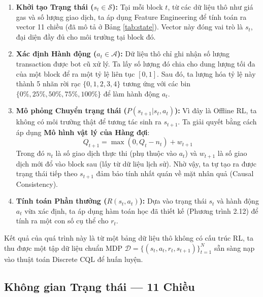 \begin{enumerate}
    \item \textbf{Khởi tạo Trạng thái ($s_t \in \mathcal{S}$):} 
    Tại mỗi block $t$, từ các dữ liệu thô như giá gas và số lượng giao dịch, ta áp dụng Feature Engineering để tính toán ra vector 11 chiều (đã mô tả ở Bảng \ref{tab:state}). Vector này đóng vai trò là $s_t$, đại diện đầy đủ cho môi trường tại block đó.
    
    \item \textbf{Xác định Hành động ($a_t \in \mathcal{A}$):} 
    Dữ liệu thô chỉ ghi nhận số lượng transaction được bot cũ xử lý. Ta lấy số lượng đó chia cho dung lượng tối đa của một block để ra một tỷ lệ liên tục $[0, 1]$. Sau đó, ta lượng hóa tỷ lệ này thành 5 nhãn rời rạc $\{0, 1, 2, 3, 4\}$ tương ứng với các bin $\{0\%, 25\%, 50\%, 75\%, 100\%\}$ để làm hành động $a_t$.
    
    \item \textbf{Mô phỏng Chuyển trạng thái ($P(s_{t+1}|s_t, a_t)$):} 
    Vì đây là Offline RL, ta không có môi trường thật để tương tác sinh ra $s_{t+1}$. Ta giải quyết bằng cách áp dụng \textbf{Mô hình vật lý của Hàng đợi}:
    $$Q_{t+1} = \max(0, Q_t - n_t) + w_{t+1}$$
    Trong đó $n_t$ là số giao dịch thực thi (phụ thuộc vào $a_t$) và $w_{t+1}$ là số giao dịch mới đổ vào block sau (lấy từ dữ liệu lịch sử). Nhờ vậy, ta tự tạo ra được trạng thái tiếp theo $s_{t+1}$ đảm bảo tính nhất quán về mặt nhân quả (Causal Consistency).
    
    \item \textbf{Tính toán Phần thưởng ($R(s_t, a_t)$):} 
    Dựa vào trạng thái $s_t$ và hành động $a_t$ vừa xác định, ta áp dụng hàm toán học đã thiết kế (Phương trình 2.12) để tính ra một con số cụ thể cho $r_t$.
\end{enumerate}

Kết quả của quá trình này là từ một bảng dữ liệu thô không có cấu trúc RL, ta thu được một tập dữ liệu chuẩn MDP $\mathcal{D} = \{(s_t, a_t, r_t, s_{t+1})\}_{t=1}^{N}$ sẵn sàng nạp vào thuật toán Discrete CQL để huấn luyện.

\subsection{Không gian Trạng thái — 11 Chiều}

